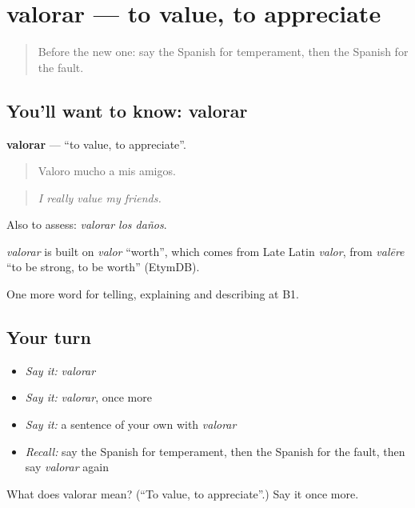 \section[valorar]{valorar — to value, to appreciate}

\label{lesson:ES-C721-valorar}



\begin{quote}
Before the new one: say the Spanish for temperament, then the Spanish for the fault.
\end{quote}

\subsection*{You'll want to know: valorar}
\textbf{valorar} — \textquotedblleft{}to value, to appreciate\textquotedblright{}.

\begin{quote}
Valoro mucho a mis amigos.
\end{quote}

\begin{quote}
\emph{I really value my friends.}
\end{quote}

Also to assess: \emph{valorar los daños}.

\begin{cousinweb}
\emph{valorar} is built on \emph{valor} \textquotedblleft{}worth\textquotedblright{}, which comes from Late Latin \emph{valor}, from \emph{valēre} \textquotedblleft{}to be strong, to be worth\textquotedblright{} (EtymDB).
\end{cousinweb}

\begin{grammarlens}[title={What you've built}]
One more word for telling, explaining and describing at B1.
\end{grammarlens}

\subsection*{Your turn}
\begin{itemize}
\raggedright
  \item \emph{Say it:} \emph{valorar}
  \item \emph{Say it:} \emph{valorar}, once more
  \item \emph{Say it:} a sentence of your own with \emph{valorar}
  \item \emph{Recall:} say the Spanish for temperament, then the Spanish for the fault, then say \emph{valorar} again
\end{itemize}

\begin{tcolorbox}[breakable,colback=teal!4,colframe=teal!35!black,title={Before you move on}]
What does valorar mean? (\textquotedblleft{}To value, to appreciate\textquotedblright{}.) Say it once more.
\end{tcolorbox}
